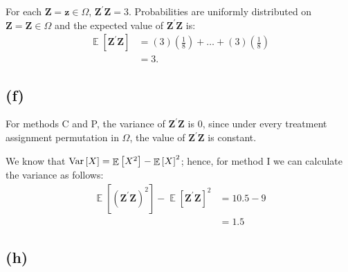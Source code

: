 \documentclass[11pt]{article}\usepackage[]{graphicx}\usepackage[]{color}
\theoremstyle{newstyle}
\DeclareMathOperator{\E}{\mathbb{E}}
\DeclareMathOperator{\Var}{\rm{Var}}
\begin{document}
For each $\mathbf{Z} = \mathbf{z} \in \Omega$, $\mathbf{Z}^{\prime}\mathbf{Z} = 3$. Probabilities are uniformly distributed on $\mathbf{Z} = \mathbf{Z} \in \Omega$ and the expected value of $\mathbf{Z}^{\prime}\mathbf{Z}$ is:
\begin{align*}
\E\left[\mathbf{Z}^{\prime}\mathbf{Z}\right] & = \left(3\right)\left(\frac{1}{8}\right) + \dots + \left(3\right)\left(\frac{1}{8}\right) \\
& = 3.
\end{align*}

\subsection{(f)}

For methods C and P, the variance of $\mathbf{Z}^{\prime} \mathbf{Z}$ is $0$, since under every treatment assignment permutation in $\Omega$, the value of $\mathbf{Z}^{\prime}\mathbf{Z}$ is constant. 

We know that $\Var\left[X\right] = \E\left[X^2\right] - \E\left[X\right]^2$; hence, for method I we can calculate the variance as follows:
\begin{align*}
\E\left[\left(\mathbf{Z}^{\prime}\mathbf{Z}\right)^2\right] - \E\left[\mathbf{Z}^{\prime}\mathbf{Z}\right]^2 & = 10.5 - 9 \\
& = 1.5
\end{align*}

\subsection{(h)}
 
\end{document}
